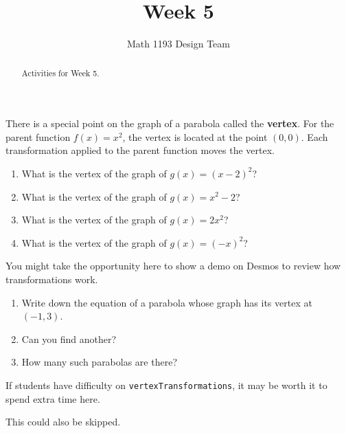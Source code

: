 \documentclass[noauthor,noinstructornotes]{ximera}
\title{Week 5}
\author{Math 1193 Design Team}
\begin{document}
\begin{abstract}
    Activities for Week 5.
\end{abstract}
\maketitle

\begin{problem}
There is a special point on the graph of a parabola called the 
\textbf{vertex}. For the parent function \(f\left(x\right)=x^2\), 
the vertex is located at the point \((0,0)\). Each transformation 
applied to the parent function moves the vertex.

\begin{enumerate}
    \item What is the vertex of the graph of \(g(x) = (x - 2)^2\)?
    \item What is the vertex of the graph of \(g(x) = x^2 - 2\)?
    \item What is the vertex of the graph of \(g(x) = 2x^2\)?
    \item What is the vertex of the graph of \(g(x) = (-x)^2\)?
\end{enumerate}

\begin{instructorNotes}
You might take the opportunity here to show a demo on Desmos to review
how transformations work.
\end{instructorNotes}
\end{problem}

\begin{problem}
\begin{enumerate}
    \item Write down the equation of a parabola whose graph has
    its vertex at \((-1, 3)\).
    \item Can you find another?
    \item How many such parabolas are there?
\end{enumerate}

\begin{instructorNotes}
If students have difficulty on \verb+vertexTransformations+, it may 
be worth it to spend extra time here. 

This could also be skipped.
\end{instructorNotes}
\end{problem}
\end{document}
